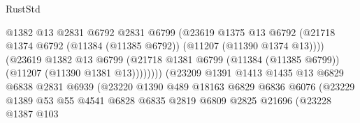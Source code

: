 \begin{lexlean}{RustStd}
\begin{coremodule}
                                          @1382
                                          @13
                                          @2831
                                          @6792
                                          @2831
                                          @6799
                                          (@23619
                                            @1375
                                            @13
                                            @6792
                                            (@21718
                                              @1374
                                              @6792
                                              (@11384 (@11385 @6792))
                                              (@11207 (@11390 @1374 @13))))
                                          (@23619
                                            @1382
                                            @13
                                            @6799
                                            (@21718
                                              @1381
                                              @6799
                                              (@11384 (@11385 @6799))
                                              (@11207 (@11390 @1381 @13))))))))
                                  (@23209
                                    @1391
                                    @1413
                                    @1435
                                    @13
                                    @6829
                                    @6838
                                    @2831
                                    @6939
                                    (@23220
                                      @1390
                                      @489
                                      @18163
                                      @6829
                                      @6836
                                      @6076
                                      (@23229
                                        @1389
                                        @53
                                        @55
                                        @4541
                                        @6828
                                        @6835
                                        @2819
                                        @6809
                                        @2825
                                        @21696
                                        (@23228
                                          @1387
                                          @103

\end{coremodule}
\end{lexlean}
